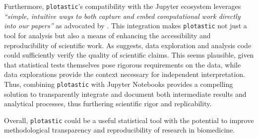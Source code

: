 Furthermore, \texttt{plotastic}'s compatibility with the Jupyter ecosystem
leverages \textit{``simple, intuitive ways to both capture and embed
computational work directly into our papers''} as advocated by
\citet{mesirovAccessibleReproducibleResearch2010}. This integration makes
\texttt{plotastic} not just a tool for analysis but also a means of enhancing
the accessibility and reproducibility of scientific work. As
\citet{pengReproducibleResearchComputational2011} suggests, data exploration and
analysis code could sufficiently verify the quality of scientific claims. This
seems plausible, given that statistical tests themselves pose rigorous
requirements on the data, while data explorations provide the context necessary
for independent interpretation. Thus, combining \texttt{plotastic} with Jupyter
Notebooks provides a compelling solution to transparently integrate and document
both intermediate results and analytical processes, thus furthering scientific
rigor and replicability.

Overall, \texttt{plotastic} could be a useful statistical tool with the
potential to improve methodological transparency and reproducibility of research
in biomedicine.


